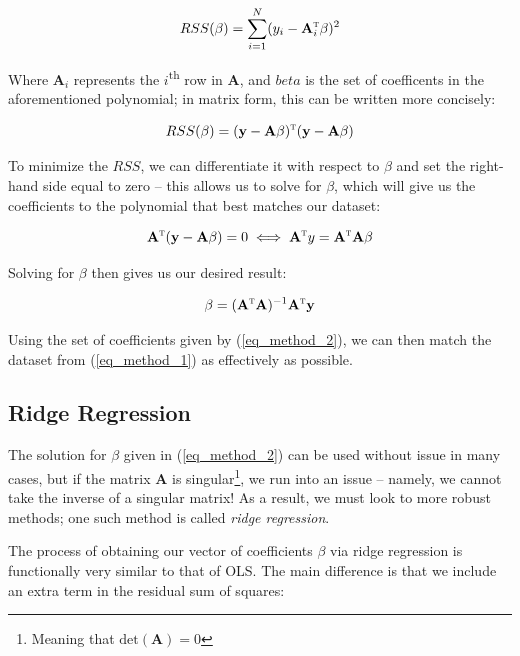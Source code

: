 \documentclass[a4paper,10pt,english]{article}
\begin{document}
\begin{equation*}
RSS(\beta) = \sum_{i=1}^N (y_i - \mathbf{A}_i^\textsc{t} \beta)^2 
\end{equation*}

Where $\mathbf{A}_i$ represents the $i$\textsuperscript{th} row in $\mathbf{A}$, and $beta$ is the set of coefficents in the aforementioned polynomial; in matrix form, this can be written more concisely:

\begin{equation*}
RSS(\beta) = (\mathbf{y} - \mathbf{A} \beta)^\textsc{t}(\mathbf{y} - \mathbf{A} \beta)
\end{equation*}

To minimize the $RSS$, we can differentiate it with respect to $\beta$ and set the right-hand side equal to zero – this allows us to solve for $\beta$, which will give us the coefficients to the polynomial that best matches our dataset:

\begin{equation*}
\mathbf{A}^\textsc{t} (\mathbf{y} - \mathbf{A} \beta) = 0 \iff \mathbf{A}^\textsc{t} y = \mathbf{A}^\textsc{t} \mathbf{A} \beta
\end{equation*}

Solving for $\beta$ then gives us our desired result:

\begin{equation}
\label{eq_method_2}
\beta = (\mathbf{A}^\textsc{t} \mathbf{A} ) ^{-1} \mathbf{A}^\textsc{t} \mathbf{y}
\end{equation}

Using the set of coefficients given by (\ref{eq_method_2}), we can then match the dataset from (\ref{eq_method_1}) as effectively as possible.

\subsection*{Ridge Regression}

The solution for $\beta$ given in (\ref{eq_method_2}) can be used without issue in many cases, but if the matrix $\mathbf{A}$ is singular\footnote{Meaning that $\text{det}(\mathbf{A}) = 0$}, we run into an issue – namely, we cannot take the inverse of a singular matrix!  As a result, we must look to more robust methods; one such method is called \textit{ridge regression}.  

The process of obtaining our vector of coefficients $\beta$ via ridge regression is functionally very similar to that of OLS.  The main difference is that we include an extra term in the residual sum of squares:
\end{document}
